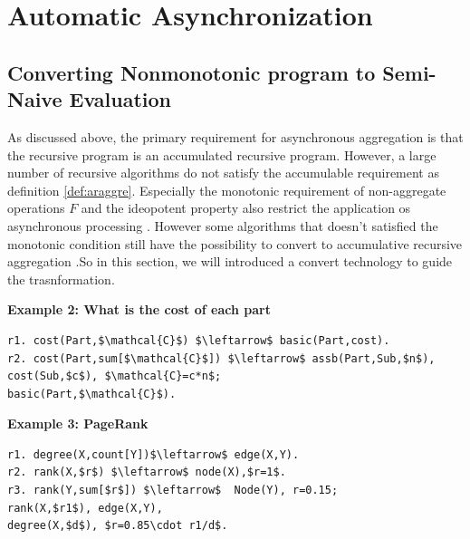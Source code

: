\section{Automatic Asynchronization}
\label{sec:async:autoasync}

\subsection{Converting Nonmonotonic program to Semi-Naive Evaluation}
\label{sec:async:convert}

As discussed above, the primary requirement for asynchronous aggregation is that the recursive program is an accumulated recursive program. %
However, a large number of recursive algorithms do not satisfy the accumulable requirement as definition \ref{def:araggre}. Especially the monotonic requirement of non-aggregate operations $F$ and the ideopotent property also restrict the application os asynchronous processing . However some algorithms that doesn't satisfied the monotonic condition still have the possibility to convert to accumulative recursive aggregation .So in this section, we will introduced a convert technology to guide the trasnformation.


\textbf{Example 2: What is the cost of each part}
\small
\begin{lstlisting}
r1. cost(Part,$\mathcal{C}$) $\leftarrow$ basic(Part,cost).
r2. cost(Part,sum[$\mathcal{C}$]) $\leftarrow$ assb(Part,Sub,$n$),
cost(Sub,$c$), $\mathcal{C}=c*n$;
basic(Part,$\mathcal{C}$).
\end{lstlisting}
\normalsize



\textbf{Example 3: PageRank}
\small
\begin{lstlisting}
r1. degree(X,count[Y])$\leftarrow$ edge(X,Y).
r2. rank(X,$r$) $\leftarrow$ node(X),$r=1$.
r3. rank(Y,sum[$r$]) $\leftarrow$  Node(Y), r=0.15;
rank(X,$r1$), edge(X,Y),
degree(X,$d$), $r=0.85\cdot r1/d$.
\end{lstlisting}
\normalsize


